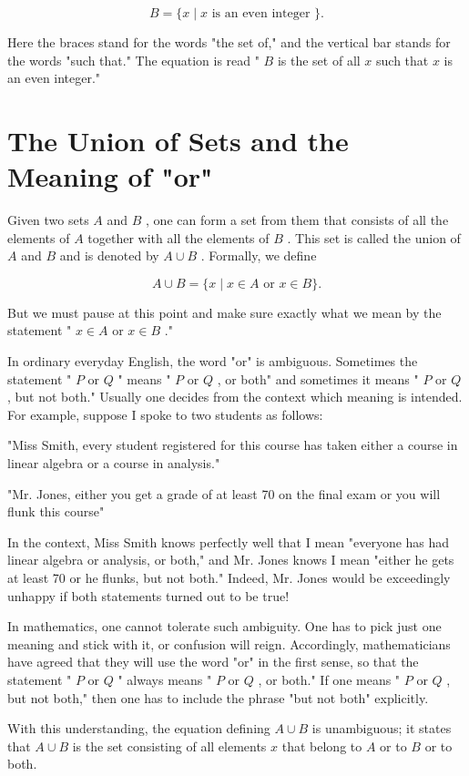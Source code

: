 \documentclass[10pt]{article}
\begin{document}
\[
B = \{ x \mid  x\text{ is an even integer }\} .
\]

Here the braces stand for the words "the set of," and the vertical bar stands for the words "such that." The equation is read " \(B\) is the set of all \(x\) such that \(x\) is an even integer."

\section*{The Union of Sets and the Meaning of "or"}

Given two sets \(A\) and \(B\) , one can form a set from them that consists of all the elements of \(A\) together with all the elements of \(B\) . This set is called the union of \(A\) and \(B\) and is denoted by \(A \cup  B\) . Formally, we define

\[
A \cup  B = \{ x \mid  x \in  A\text{ or }x \in  B\} .
\]

But we must pause at this point and make sure exactly what we mean by the statement " \(x \in  A\) or \(x \in  B\) ."

In ordinary everyday English, the word "or" is ambiguous. Sometimes the statement " \(P\) or \(Q\) " means " \(P\) or \(Q\) , or both" and sometimes it means " \(P\) or \(Q\) , but not both." Usually one decides from the context which meaning is intended. For example, suppose I spoke to two students as follows:

"Miss Smith, every student registered for this course has taken either a course in linear algebra or a course in analysis."

"Mr. Jones, either you get a grade of at least 70 on the final exam or you will flunk this course"

In the context, Miss Smith knows perfectly well that I mean "everyone has had linear algebra or analysis, or both," and Mr. Jones knows I mean "either he gets at least 70 or he flunks, but not both." Indeed, Mr. Jones would be exceedingly unhappy if both statements turned out to be true!

In mathematics, one cannot tolerate such ambiguity. One has to pick just one meaning and stick with it, or confusion will reign. Accordingly, mathematicians have agreed that they will use the word "or" in the first sense, so that the statement " \(P\) or \(Q\) " always means " \(P\) or \(Q\) , or both." If one means " \(P\) or \(Q\) , but not both," then one has to include the phrase "but not both" explicitly.

With this understanding, the equation defining \(A \cup  B\) is unambiguous; it states that \(A \cup  B\) is the set consisting of all elements \(x\) that belong to \(A\) or to \(B\) or to both.
\end{document}
